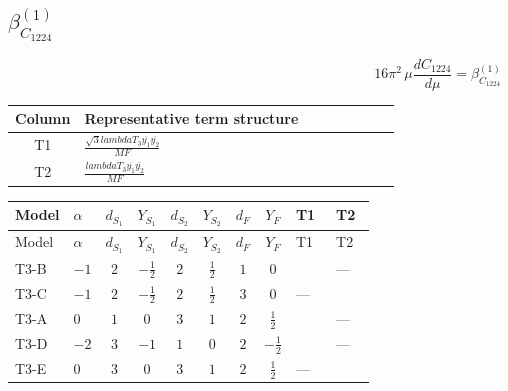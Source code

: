 \documentclass[8pt]{article}
\begin{document}
\begin{landscape}
\section*{$\beta_{C_{1224}}^{(1)}$}
\[16\pi^2\,\mu\frac{d C_{1224}}{d\mu}=\beta_{C_{1224}}^{(1)}\]
\begin{center}
\begin{tabular}{@{}c >{\raggedright\arraybackslash}p{0.82\linewidth}@{}}
\toprule
Column & Representative term structure \\
\midrule
T1 & \(\displaystyle \frac{\sqrt{3} lambdaT_{3} \overline{y_{1}} \overline{y_{2}}}{MF}\) \\
\midrule
T2 & \(\displaystyle \frac{lambdaT_{3} \overline{y_{1}} \overline{y_{2}}}{MF}\) \\
\midrule
\bottomrule
\end{tabular}
\end{center}
\smallskip
\tiny
\begin{longtable}{@{}llcccccc >{\raggedright\arraybackslash}p{0.21\linewidth} >{\raggedright\arraybackslash}p{0.21\linewidth}@{}}
\toprule
Model & $\alpha$ & $d_{S_1}$ & $Y_{S_1}$ & $d_{S_2}$ & $Y_{S_2}$ & $d_F$ & $Y_F$ & T1 & T2 \\
\midrule
\endfirsthead
\toprule
Model & $\alpha$ & $d_{S_1}$ & $Y_{S_1}$ & $d_{S_2}$ & $Y_{S_2}$ & $d_F$ & $Y_F$ & T1 & T2 \\
\midrule
\endhead
T3-B & $-1$ & $2$ & $-\frac{1}{2}$ & $2$ & $\frac{1}{2}$ & $1$ & $0$ & \scriptsize\adjustbox{max width=\linewidth}{$\begin{gathered} \frac{\sqrt{3} lambdaT_{3} \overline{y_{1}} \overline{y_{2}}}{3 MF}\end{gathered}$} & --- \\
\midrule
T3-C & $-1$ & $2$ & $-\frac{1}{2}$ & $2$ & $\frac{1}{2}$ & $3$ & $0$ & --- & \scriptsize\adjustbox{max width=\linewidth}{$\begin{gathered} - \frac{2 lambdaT_{3} \overline{y_{1}} \overline{y_{2}}}{3 MF}\end{gathered}$} \\
\midrule
T3-A & $0$ & $1$ & $0$ & $3$ & $1$ & $2$ & $\frac{1}{2}$ & \scriptsize\adjustbox{max width=\linewidth}{$\begin{gathered} \frac{\sqrt{3} lambdaT_{3} \overline{y_{1}} \overline{y_{2}}}{3 MF}\end{gathered}$} & --- \\
\midrule
T3-D & $-2$ & $3$ & $-1$ & $1$ & $0$ & $2$ & $-\frac{1}{2}$ & \scriptsize\adjustbox{max width=\linewidth}{$\begin{gathered} \frac{\sqrt{3} lambdaT_{3} \overline{y_{1}} \overline{y_{2}}}{3 MF}\end{gathered}$} & --- \\
\midrule
T3-E & $0$ & $3$ & $0$ & $3$ & $1$ & $2$ & $\frac{1}{2}$ & --- & \scriptsize\adjustbox{max width=\linewidth}{$\begin{gathered} - \frac{lambdaT_{3} \overline{y_{1}} \overline{y_{2}}}{MF}\end{gathered}$} \\
\midrule
\bottomrule
\end{longtable}
\clearpage

\end{landscape}
\end{document}
